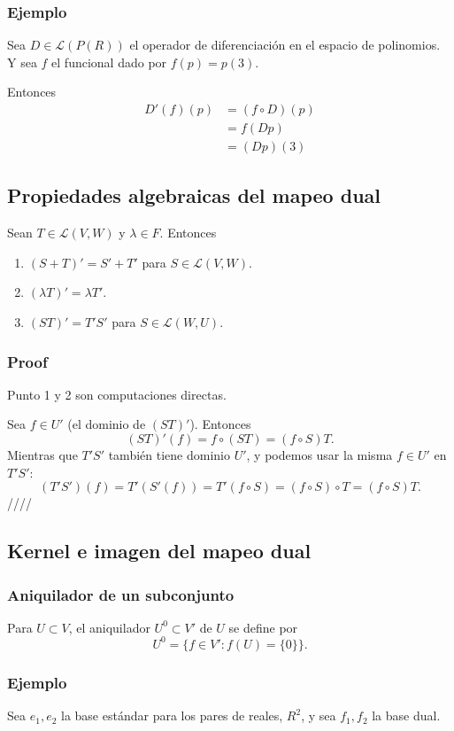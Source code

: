 \documentclass{article}
\begin{document}
\subsubsection{Ejemplo}
Sea $D\in\mathcal{L}(P(R))$ el operador de diferenciación
en el espacio de polinomios. Y sea $f$ el funcional dado por
$f(p) = p(3)$.

Entonces \begin{align*}
    D'(f)(p)&=(f\circ D)(p) \\
    &= f(Dp)\\
    &= (Dp)(3)
\end{align*}

\subsection{Propiedades algebraicas del mapeo dual}
Sean $T\in\mathcal{L}(V,W)$ y $\lambda\in F$. Entonces
\begin{enumerate}
    \item $(S+T)' = S' + T'$ para $S\in\mathcal{L}(V,W)$.
    \item $(\lambda T)' = \lambda T'$.
    \item $(ST)'=T'S'$ para $S\in\mathcal{L}(W,U)$.
\end{enumerate}
\subsubsection*{Proof}
Punto 1 y 2 son computaciones directas.

Sea $f\in U'$ (el dominio de $(ST)'$). Entonces
$$(ST)'(f) = f\circ (ST) = (f\circ S)T.$$
Mientras que $T'S'$ también tiene dominio $U'$, y podemos usar la
misma $f\in U'$ en $T'S'$:
$$(T'S')(f)=T'(S'(f))=T'(f\circ S)=(f\circ S)\circ T= (f\circ S)T.$$
\hfill ////

\subsection{Kernel e imagen del mapeo dual}
\subsubsection{Aniquilador de un subconjunto}
Para $U\subset V$, el aniquilador $U^0\subset V'$ de $U$ se define por
$$U^0 = \{f\in V': f(U) = \{0\}\}.$$

\subsubsection{Ejemplo}
Sea $e_1,e_2$ la base estándar para los pares de reales, $R^2$, y sea
$f_1,f_2$ la base dual.
\end{document}
